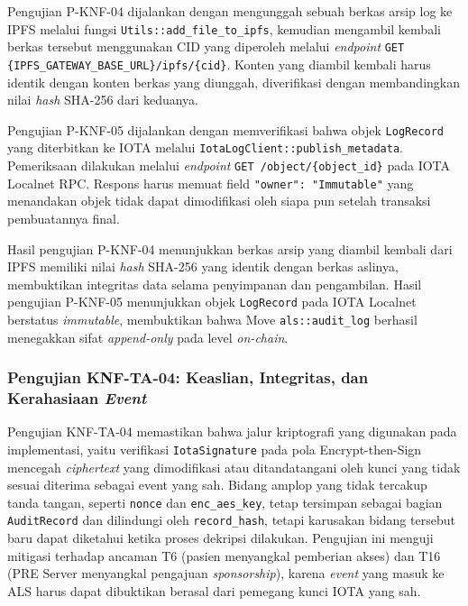 Pengujian P-KNF-04 dijalankan dengan mengunggah sebuah berkas arsip log ke IPFS melalui fungsi \texttt{Utils::add\_file\_to\_ipfs}, kemudian mengambil kembali berkas tersebut menggunakan CID yang diperoleh melalui \textit{endpoint} \texttt{GET \{IPFS\_GATEWAY\_BASE\_URL\}/ipfs/\{cid\}}. Konten yang diambil kembali harus identik dengan konten berkas yang diunggah, diverifikasi dengan membandingkan nilai \textit{hash} SHA-256 dari keduanya.

Pengujian P-KNF-05 dijalankan dengan memverifikasi bahwa objek \texttt{LogRecord} yang diterbitkan ke IOTA melalui \texttt{IotaLogClient::publish\_metadata}. Pemeriksaan dilakukan melalui \textit{endpoint} \texttt{GET /object/\{object\_id\}} pada IOTA Localnet RPC. Respons harus memuat field \texttt{"owner": "Immutable"} yang menandakan objek tidak dapat dimodifikasi oleh siapa pun setelah transaksi pembuatannya final.

Hasil pengujian P-KNF-04 menunjukkan berkas arsip yang diambil kembali dari IPFS memiliki nilai \textit{hash} SHA-256 yang identik dengan berkas aslinya, membuktikan integritas data selama penyimpanan dan pengambilan. Hasil pengujian P-KNF-05 menunjukkan objek \texttt{LogRecord} pada IOTA Localnet berstatus \textit{immutable}, membuktikan bahwa Move \texttt{als::audit\_log} berhasil menegakkan sifat \textit{append-only} pada level \textit{on-chain}.

\subsubsection{Pengujian KNF-TA-04: Keaslian, Integritas, dan Kerahasiaan \textit{Event}}
 
Pengujian KNF-TA-04 memastikan bahwa jalur kriptografi yang digunakan pada
implementasi, yaitu verifikasi \texttt{IotaSignature} pada pola Encrypt-then-Sign mencegah \textit{ciphertext} yang dimodifikasi atau ditandatangani oleh kunci yang tidak sesuai diterima sebagai event yang sah. Bidang amplop yang tidak tercakup tanda tangan, seperti \texttt{nonce} dan \texttt{enc\_aes\_key}, tetap tersimpan sebagai bagian \texttt{AuditRecord} dan dilindungi oleh \texttt{record\_hash}, tetapi karusakan bidang tersebut baru dapat diketahui ketika proses dekripsi dilakukan. Pengujian ini menguji mitigasi
terhadap ancaman T6 (pasien menyangkal pemberian akses) dan T16 (PRE Server
menyangkal pengajuan \textit{sponsorship}), karena \textit{event} yang masuk ke
ALS harus dapat dibuktikan berasal dari pemegang kunci IOTA yang sah.
 
